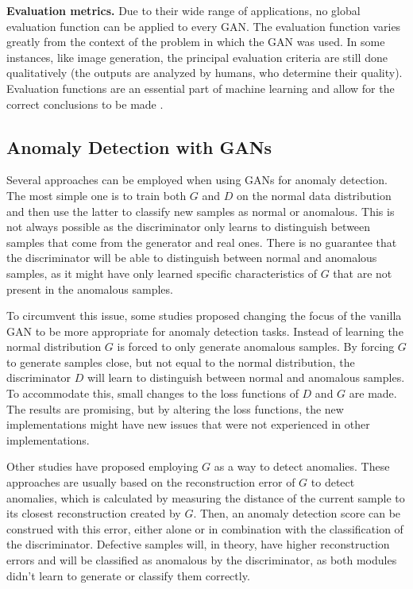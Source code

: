 \noindent\textbf{Evaluation metrics.} Due to their wide range of applications, no global evaluation function can be applied to every GAN. The evaluation function varies greatly from the context of the problem in which the GAN was used. In some instances, like image generation, the principal evaluation criteria are still done qualitatively (the outputs are analyzed by humans, who determine their quality). Evaluation functions are an essential part of machine learning and allow for the correct conclusions to be made \cite{saxena.cao_GenerativeAdversarialNetworks_2022}.


\subsection{Anomaly Detection with GANs}\label{sec:gan_anomaly_detection}

Several approaches can be employed when using GANs for anomaly detection. The most simple one is to train both $G$ and $D$ on the normal data distribution and then use the latter to classify new samples as normal or anomalous. This is not always possible as the discriminator only learns to distinguish between samples that come from the generator and real ones. There is no guarantee that the discriminator will be able to distinguish between normal and anomalous samples, as it might have only learned specific characteristics of $G$ that are not present in the anomalous samples.

To circumvent this issue, some studies \cite{ngo.etal_FenceGANBetter_2019, liu.etal_GenerativeAdversarialActive_2020} proposed changing the focus of the vanilla GAN to be more appropriate for anomaly detection tasks. Instead of learning the normal distribution $G$ is forced to only generate anomalous samples. By forcing $G$ to generate samples close, but not equal to the normal distribution, the discriminator $D$ will learn to distinguish between normal and anomalous samples. To accommodate this, small changes to the loss functions of $D$ and $G$ are made. The results are promising, but by altering the loss functions, the new implementations might have new issues that were not experienced in other implementations.

Other studies \cite{li.etal_MADGANMultivariateAnomaly_2019, zenati.etal_AdversariallyLearnedAnomaly_2018, bashar.nayak_TAnoGANTimeSeries_2020} have proposed employing $G$ as a way to detect anomalies. These approaches are usually based on the reconstruction error of $G$ to detect anomalies, which is calculated by measuring the distance of the current sample to its closest reconstruction created by $G$. Then, an anomaly detection score can be construed with this error, either alone or in combination with the classification of the discriminator. Defective samples will, in theory, have higher reconstruction errors and will be classified as anomalous by the discriminator, as both modules didn't learn to generate or classify them correctly.

